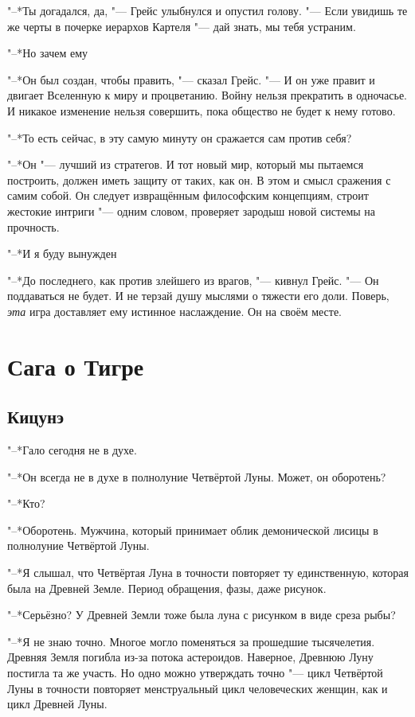 "--*Ты догадался, да, "--- Грейс улыбнулся и опустил голову.
"--- Если увидишь те же черты в почерке иерархов Картеля "--- дай знать, мы тебя устраним.

"--*Но зачем ему\ldotsq

"--*Он был создан, чтобы править, "--- сказал Грейс.
"--- И он уже правит и двигает Вселенную к миру и процветанию.
Войну нельзя прекратить в одночасье.
И никакое изменение нельзя совершить, пока общество не будет к нему готово.

"--*То есть сейчас, в эту самую минуту он сражается сам против себя?

"--*Он "--- лучший из стратегов.
И тот новый мир, который мы пытаемся построить, должен иметь защиту от таких, как он.
В этом и смысл сражения с самим собой.
Он следует извращённым философским концепциям, строит жестокие интриги "--- одним словом, проверяет зародыш новой системы на прочность.

"--*И я буду вынужден\ldotst

"--*До последнего, как против злейшего из врагов, "--- кивнул Грейс.
"--- Он поддаваться не будет.
И не терзай душу мыслями о тяжести его доли.
Поверь, \emph{эта} игра доставляет ему истинное наслаждение.
Он на своём месте.

\chapter{Сага о Тигре}

\section{Кицунэ}

"--*Гало сегодня не в духе.

"--*Он всегда не в духе в полнолуние Четвёртой Луны.
Может, он оборотень?

"--*Кто?

"--*Оборотень.
Мужчина, который принимает облик демонической лисицы в полнолуние Четвёртой Луны.

"--*Я слышал, что Четвёртая Луна в точности повторяет ту единственную, которая была на Древней Земле.
Период обращения, фазы, даже рисунок.

"--*Серьёзно?
У Древней Земли тоже была луна с рисунком в виде среза рыбы?

"--*Я не знаю точно.
Многое могло поменяться за прошедшие тысячелетия.
Древняя Земля погибла из-за потока астероидов.
Наверное, Древнюю Луну постигла та же участь.
Но одно можно утверждать точно "--- цикл Четвёртой Луны в точности повторяет менструальный цикл человеческих женщин, как и цикл Древней Луны.

